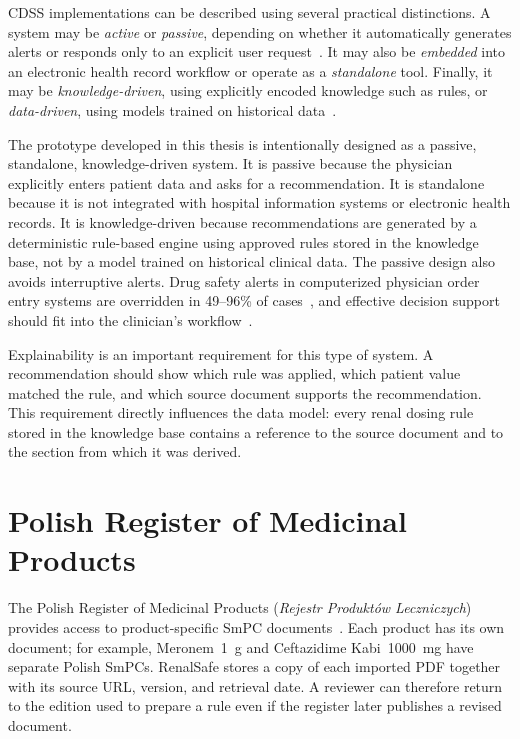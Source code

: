 \documentclass[12pt,a4paper,twoside]{book}
\begin{document}
CDSS implementations can be described using several practical distinctions. 
A system may be \textit{active} or \textit{passive}, depending on whether it automatically generates alerts or responds only to an explicit user request~\cite{artSutton2020CDSSOverview}.
It may also be \textit{embedded} into an electronic health record workflow or operate as a \textit{standalone} tool. 
Finally, it may be \textit{knowledge-driven}, using explicitly encoded knowledge such as rules, or \textit{data-driven}, using models trained on historical data~\cite{artSutton2020CDSSOverview}.

The prototype developed in this thesis is intentionally designed as a passive, standalone, knowledge-driven system. 
It is passive because the physician explicitly enters patient data and asks for a recommendation. 
It is standalone because it is not integrated with hospital information systems or electronic health records. 
It is knowledge-driven because recommendations are generated by a deterministic rule-based engine using approved rules stored in the knowledge base, not by a model trained on historical clinical data.
The passive design also avoids interruptive alerts.
Drug safety alerts in computerized physician order entry systems are overridden in 49--96\% of cases~\cite{artVanderSijs2006Override}, and effective decision support should fit into the clinician's workflow~\cite{artBates2003TenCommandments}.

Explainability is an important requirement for this type of system. 
A recommendation should show which rule was applied, which patient value matched the rule, and which source document supports the recommendation. 
This requirement directly influences the data model: every renal dosing rule stored in the knowledge base contains a reference to the source document and to the section from which it was derived.

\section{Polish Register of Medicinal Products}
\label{sec:healthcare-data-platforms}

The Polish Register of Medicinal Products (\textit{Rejestr Produktów Leczniczych}) provides access to product-specific SmPC documents~\cite{miscURPLRPL,miscEZdrowieRPLXML}.
Each product has its own document; for example, Meronem~1~g and Ceftazidime Kabi~1000~mg have separate Polish SmPCs.
RenalSafe stores a copy of each imported PDF together with its source URL, version, and retrieval date.
A reviewer can therefore return to the edition used to prepare a rule even if the register later publishes a revised document.
\end{document}
